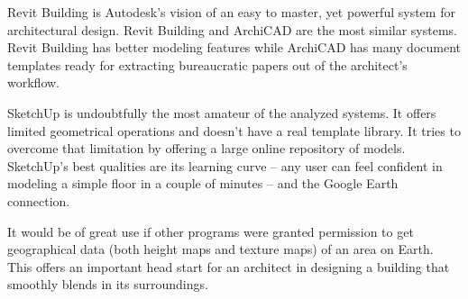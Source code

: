 Revit Building is Autodesk's vision of an easy to master, yet powerful system for architectural design.
Revit Building and ArchiCAD are the most similar systems.
Revit Building has better modeling features while ArchiCAD has many document templates
ready for extracting bureaucratic papers out of the architect's workflow.

SketchUp is undoubtfully the most amateur of the analyzed systems.
It offers limited geometrical operations and doesn't have a real template library.
It tries to overcome that limitation by offering a large online repository of models.
SketchUp's best qualities are its learning curve -- any user can feel confident in
modeling a simple floor in a couple of minutes -- and the Google Earth connection.

It would be of great use if other programs were granted permission to get geographical
data (both height maps and texture maps) of an area on Earth.
This offers an important head start for an architect in designing a building that
smoothly blends in its surroundings.
